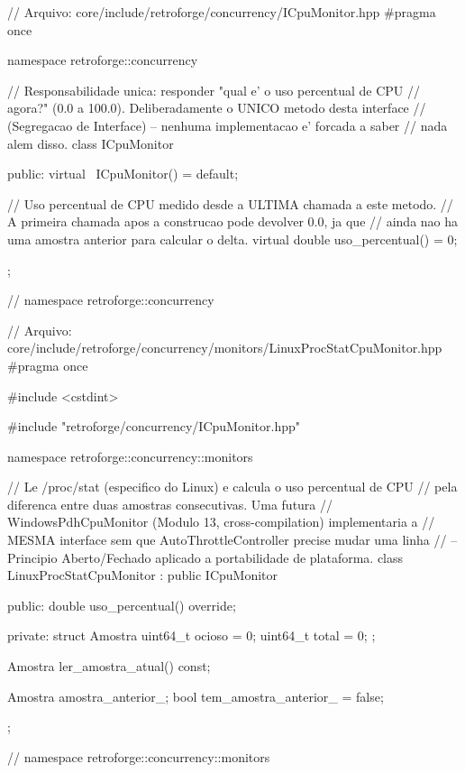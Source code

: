 \begin{CaixaCodigo}
// Arquivo: core/include/retroforge/concurrency/ICpuMonitor.hpp
#pragma once

namespace retroforge::concurrency {

// Responsabilidade unica: responder "qual e' o uso percentual de CPU
// agora?" (0.0 a 100.0). Deliberadamente o UNICO metodo desta interface
// (Segregacao de Interface) -- nenhuma implementacao e' forcada a saber
// nada alem disso.
class ICpuMonitor {
public:
    virtual ~ICpuMonitor() = default;

    // Uso percentual de CPU medido desde a ULTIMA chamada a este metodo.
    // A primeira chamada apos a construcao pode devolver 0.0, ja que
    // ainda nao ha uma amostra anterior para calcular o delta.
    virtual double uso_percentual() = 0;
};

} // namespace retroforge::concurrency
\end{CaixaCodigo}

\begin{CaixaCodigo}
// Arquivo: core/include/retroforge/concurrency/monitors/LinuxProcStatCpuMonitor.hpp
#pragma once

#include <cstdint>

#include "retroforge/concurrency/ICpuMonitor.hpp"

namespace retroforge::concurrency::monitors {

// Le /proc/stat (especifico do Linux) e calcula o uso percentual de CPU
// pela diferenca entre duas amostras consecutivas. Uma futura
// WindowsPdhCpuMonitor (Modulo 13, cross-compilation) implementaria a
// MESMA interface sem que AutoThrottleController precise mudar uma linha
// -- Principio Aberto/Fechado aplicado a portabilidade de plataforma.
class LinuxProcStatCpuMonitor : public ICpuMonitor {
public:
    double uso_percentual() override;

private:
    struct Amostra {
        uint64_t ocioso = 0;
        uint64_t total = 0;
    };

    Amostra ler_amostra_atual() const;

    Amostra amostra_anterior_{};
    bool tem_amostra_anterior_ = false;
};

} // namespace retroforge::concurrency::monitors
\end{CaixaCodigo}

